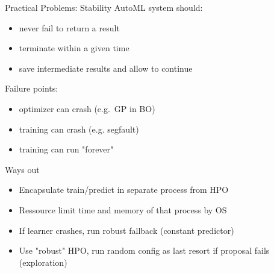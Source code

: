 \begin{frame}{Practical Problems: Stability}
  AutoML system should: 
  \begin{itemize}
    \item never fail to return a result
    \item terminate within a given time
    \item save intermediate results and allow to continue
  \end{itemize}

  Failure points:
  \begin{itemize}
    \item optimizer can crash (e.g.\ GP in BO) 
    \item training can crash (e.g. segfault) 
    \item training can run "forever" 
  \end{itemize}

  Ways out
  \begin{itemize}
    \item Encapsulate train/predict in separate process from HPO
    \item Ressource limit time and memory of that process by OS
    \item If learner crashes, run robust fallback (constant predictor)   
    \item Use "robust" HPO, run random config as last resort if proposal fails (exploration)
  \end{itemize}

\end{frame}

